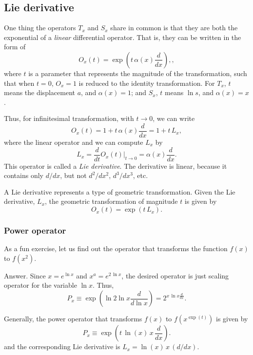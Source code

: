\documentclass{article}
\begin{document}
\subsection{Lie derivative}

One thing the operators $T_x$ and $S_x$ share in common
is that they are both the exponential of a \emph{linear}
differential operator.
%
That is, they can be written in the form of
\begin{equation}
O_x(t) = \exp\left( t \, \alpha(x) \frac{d}{dx} \right),
\label{eq:exponential_operator_1D},
\end{equation}
where $t$ is a parameter that
represents the magnitude of the transformation,
such that when $t = 0$, $O_x = 1$
is reduced to the identity transformation.
%
For $T_x$, $t$ means the displacement $a$, and $\alpha(x) = 1$;
and $S_x$, $t$ means $\ln s$, and $\alpha(x) = x$.
%

Thus, for infinitesimal transformation, with $t \rightarrow 0$,
we can write
$$
O_x(t) = 1 + t \, \alpha(x) \frac{d}{dx}
= 1 + t \, L_x,
$$
where the linear operator and we can compute $L_x$ by
\begin{equation}
L_x = \frac{d}{dt} O_x(t) \Bigg|_{t\rightarrow 0}
= \alpha(x) \frac{d}{dx}.
\label{eq:lieder_1D}
\end{equation}
This operator is called a \emph{Lie derivative}.
%
The derivative is linear, because it contains only $d/dx$,
but not $d^2/dx^2$, $d^3/dx^3$, etc.
%


A Lie derivative represents
a type of geometric transformation.
%
Given the Lie derivative, $L_x$,
the geometric transformation of magnitude $t$
is given by
\begin{equation}
O_x(t) = \exp(t \, L_x).
\label{eq:exponentialrule}
\end{equation}


\subsubsection{Power operator}


As a fun exercise, let us find out
the operator that transforms
the function $f(x)$ to $f(x^2)$.

Answer.
Since $x = e^{\ln x}$
and $x^a = e^{2 \, \ln x}$,
the desired operator is just scaling operator
for the variable $\ln x$.
Thus,
$$
P_x
\equiv \exp\left(\ln 2  \ln x \frac{d}{d\ln x} \right)
= 2^{ x \, \ln x \frac{d}{dx} }.
$$

Generally, the power operator that transforms
$f(x)$ to $f(x^{\exp(t)})$
is given by
$$
P_x
\equiv \exp\left(t \, \ln(x) \, x \, \frac{d}{dx} \right).
$$
and the corresponding Lie derivative is
$L_x = \ln(x) \, x \, (d/dx)$.
\end{document}
